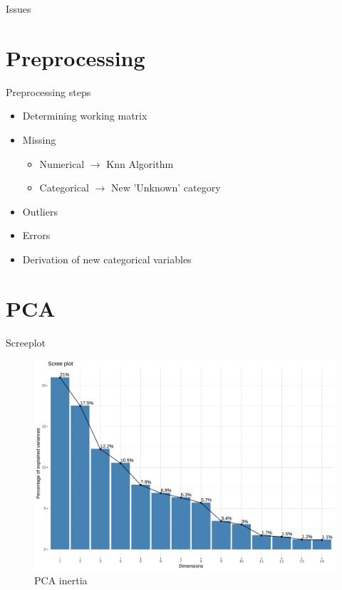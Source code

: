 \begin{frame}{Issues}
\end{frame}

\section{Preprocessing}
\begin{frame}{Preprocessing steps}
\large
\begin{itemize}
     \itemsep0.5em
     \item Determining working matrix
     \item Missing 
     \begin{itemize}
         \itemsep0.25em
         \item Numerical $\rightarrow$ Knn Algorithm
         \item Categorical $\rightarrow$ New 'Unknown' category 
     \end{itemize}
     \item Outliers
     \item Errors
     \item Derivation of new categorical variables
\end{itemize}
\normalsize
\end{frame}

\section{PCA}
\begin{frame}{Screeplot}
\begin{figure}[H]
    \centering
    \includegraphics[width=0.7\linewidth]{pca_fact-screeplot} %
    \caption{PCA inertia}%
    \label{fig:pca_inertia}
\end{figure}
\end{frame}

